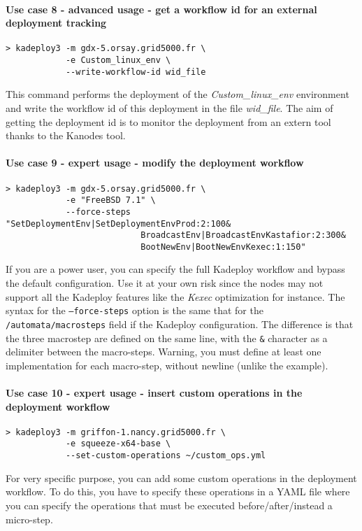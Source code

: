 \documentclass[a4wide,10pt,oneside]{book}
\newcommand{\ypath}[1]{\texttt{#1}}
\begin{document}
\paragraph{Use case 8 - advanced usage - get a workflow id for an external deployment tracking}\label{par:usecase-wid}
\begin{verbatim}
> kadeploy3 -m gdx-5.orsay.grid5000.fr \
            -e Custom_linux_env \
            --write-workflow-id wid_file
\end{verbatim}
This command performs the deployment of the \textit{Custom\_linux\_env} environment and write the workflow id of this deployment in the file \textit{wid\_file}. The aim of getting the deployment id is to monitor the deployment from an extern tool thanks to the Kanodes tool.

\paragraph{Use case 9 - expert usage - modify the deployment workflow}
\begin{verbatim}
> kadeploy3 -m gdx-5.orsay.grid5000.fr \
            -e "FreeBSD 7.1" \
            --force-steps "SetDeploymentEnv|SetDeploymentEnvProd:2:100&
                           BroadcastEnv|BroadcastEnvKastafior:2:300&
                           BootNewEnv|BootNewEnvKexec:1:150"
\end{verbatim}
If you are a power user, you can specify the full Kadeploy workflow and bypass the default configuration. Use it at your own risk since the nodes may not support all the Kadeploy features like the \textit{Kexec} optimization for instance. The syntax for the \texttt{--force-steps} option is the same that for the \ypath{/automata/macrosteps} field if the Kadeploy configuration. The difference is that the three macrostep are defined on the same line, with the \texttt{\&} character as a delimiter between the macro-steps. Warning, you must define at least one implementation for each macro-step, without newline (unlike the example).

\paragraph{Use case 10 - expert usage - insert custom operations in the deployment workflow}
\begin{verbatim}
> kadeploy3 -m griffon-1.nancy.grid5000.fr \
            -e squeeze-x64-base \
            --set-custom-operations ~/custom_ops.yml
\end{verbatim}
For very specific purpose, you can add some custom operations in the deployment workflow. To do this, you have to specify these operations in a YAML file where you can specify the operations that must be executed before/after/instead a micro-step.
\end{document}
